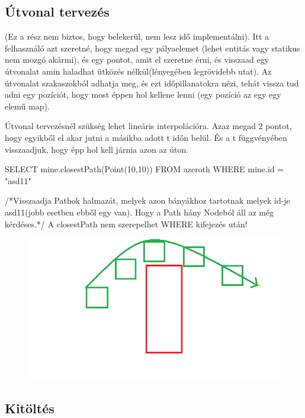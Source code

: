 \begin{sql}
\subsection{Útvonal tervezés}

(Ez a rész nem biztos, hogy belekerül, nem lesz idő implementálni). Itt a felhasználó azt szeretné, hogy megad egy pályaelemet (lehet entitás vagy statikus nem mozgó akármi), és egy pontot, amit el szeretne érni, és visszaad egy útvonalat amin haladhat ütközés nélkül(lényegében legrövidebb utat). Az útvonalat szakaszokból adhatja meg, és ezt időpillanatokra nézi, tehát vissza tud adni egy pozíciót, hogy most éppen hol kellene lenni (egy pozíció az egy egy elemű map).

Útvonal tervezésnél szükség lehet lineáris interpolációra. Azaz megad 2 pontot, hogy egyikből el akar jutni a másikba adott t időn belül. És a t függvényében visszaadjuk, hogy épp hol kell járnia azon az úton.

\begin{sql}
SELECT mine.closestPath(Point(10,10)) FROM azeroth WHERE mine.id = "asd11"
\end{sql}
/*Visszaadja Pathok halmazát, melyek azon bányákhoz tartotnak melyek id-je asd11(jobb esetben ebből egy van). Hogy a Path hány Nodeból áll az még kérdéses.*/
A closestPath nem szerepelhet WHERE kifejezés után!

\begin{figure}[htb]
\begin{center}
    \includegraphics[scale=0.5]{images/path}
    \caption{}
    \label{fig:path}
\end{center}
\end{figure}

\subsection{Kitöltés}


\end{sql}
